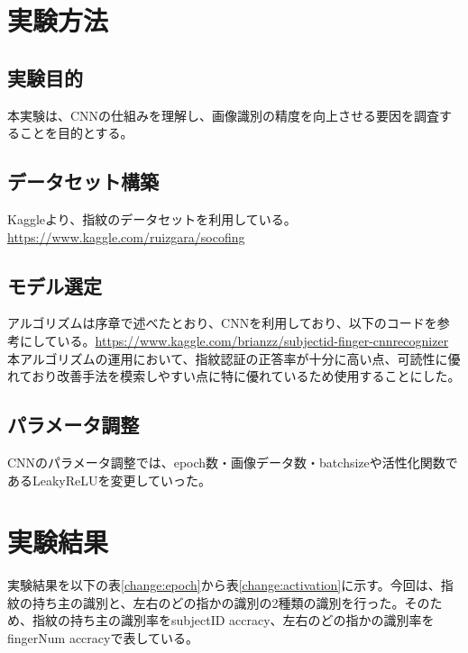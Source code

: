 \documentclass[a4paper, 11pt, titlepage]{jsarticle}
\begin{document}
\section{実験方法}


\subsection{実験目的}
本実験は、CNNの仕組みを理解し、画像識別の精度を向上させる要因を調査することを目的とする。


\subsection{データセット構築}
Kaggleより、指紋のデータセットを利用している。\url{https://www.kaggle.com/ruizgara/socofing}

\subsection{モデル選定}
アルゴリズムは序章で述べたとおり、CNNを利用しており、以下のコードを参考にしている。\url{https://www.kaggle.com/brianzz/subjectid-finger-cnnrecognizer}\\
本アルゴリズムの運用において、指紋認証の正答率が十分に高い点、可読性に優れており改善手法を模索しやすい点に特に優れているため使用することにした。

\subsection{パラメータ調整}
CNNのパラメータ調整では、epoch数・画像データ数・batchsizeや活性化関数であるLeakyReLUを変更していった。


\section{実験結果}

実験結果を以下の表\ref{change:epoch}から表\ref{change:activation}に示す。今回は、指紋の持ち主の識別と、左右のどの指かの識別の2種類の識別を行った。そのため、指紋の持ち主の識別率をsubjectID accracy、左右のどの指かの識別率をfingerNum accracyで表している。
\end{document}
